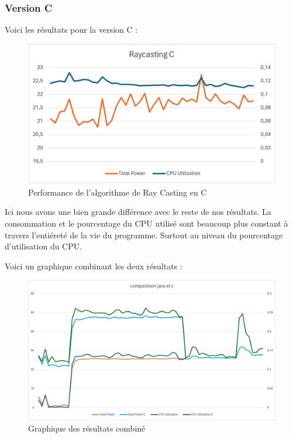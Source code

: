 \documentclass[12pt, a4paper]{report}
\begin{document}
\subsubsection{Version C}
Voici les résultats pour la version C :
\begin{figure}[H]
    \includegraphics[width=1\linewidth]{res/graph/Raycasting/raycasting c.png}
    \caption{Performance de l'algorithme de Ray Casting en C}
    \label{fig:c_raycasting}
\end{figure}

Ici nous avons une bien grande différence avec le reste de nos résultats. La consommation et le pourcentage du CPU utilisé sont beaucoup plus constant à travers l'entiéreté de la vie du programme. Surtout au niveau du pourcentage d'utilisation du CPU.

Voici un graphique combinant les deux résultats :
\begin{figure}[H]
    \includegraphics[width=1\linewidth]{res/graph/Raycasting/raycasting_combined.png}
    \caption{Graphique des résultats combiné}
    \label{fig:raycasting_combined}
\end{figure}
\end{document}
